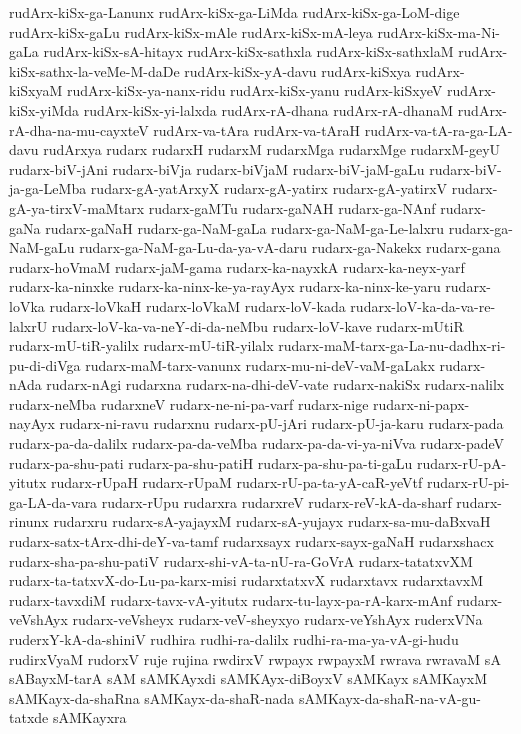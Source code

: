 {rudArx-kiSx-ga-Lanunx
rudArx-kiSx-ga-LiMda
rudArx-kiSx-ga-LoM-dige
rudArx-kiSx-gaLu
rudArx-kiSx-mAle
rudArx-kiSx-mA-leya
rudArx-kiSx-ma-Ni-gaLa
rudArx-kiSx-sA-hitayx
rudArx-kiSx-sathxla
rudArx-kiSx-sathxlaM
rudArx-kiSx-sathx-la-veMe-M-daDe
rudArx-kiSx-yA-davu
rudArx-kiSxya
rudArx-kiSxyaM
rudArx-kiSx-ya-nanx-ridu
rudArx-kiSx-yanu
rudArx-kiSxyeV
rudArx-kiSx-yiMda
rudArx-kiSx-yi-lalxda
rudArx-rA-dhana
rudArx-rA-dhanaM
rudArx-rA-dha-na-mu-cayxteV
rudArx-va-tAra
rudArx-va-tAraH
rudArx-va-tA-ra-ga-LA-davu
rudArxya
rudarx
rudarxH
rudarxM
rudarxMga
rudarxMge
rudarxM-geyU
rudarx-biV-jAni
rudarx-biVja
rudarx-biVjaM
rudarx-biV-jaM-gaLu
rudarx-biV-ja-ga-LeMba
rudarx-gA-yatArxyX
rudarx-gA-yatirx
rudarx-gA-yatirxV
rudarx-gA-ya-tirxV-maMtarx
rudarx-gaMTu
rudarx-gaNAH
rudarx-ga-NAnf
rudarx-gaNa
rudarx-gaNaH
rudarx-ga-NaM-gaLa
rudarx-ga-NaM-ga-Le-lalxru
rudarx-ga-NaM-gaLu
rudarx-ga-NaM-ga-Lu-da-ya-vA-daru
rudarx-ga-Nakekx
rudarx-gana
rudarx-hoVmaM
rudarx-jaM-gama
rudarx-ka-nayxkA
rudarx-ka-neyx-yarf
rudarx-ka-ninxke
rudarx-ka-ninx-ke-ya-rayAyx
rudarx-ka-ninx-ke-yaru
rudarx-loVka
rudarx-loVkaH
rudarx-loVkaM
rudarx-loV-kada
rudarx-loV-ka-da-va-re-lalxrU
rudarx-loV-ka-va-neY-di-da-neMbu
rudarx-loV-kave
rudarx-mUtiR
rudarx-mU-tiR-yalilx
rudarx-mU-tiR-yilalx
rudarx-maM-tarx-ga-La-nu-dadhx-ri-pu-di-diVga
rudarx-maM-tarx-vanunx
rudarx-mu-ni-deV-vaM-gaLakx
rudarx-nAda
rudarx-nAgi
rudarxna
rudarx-na-dhi-deV-vate
rudarx-nakiSx
rudarx-nalilx
rudarx-neMba
rudarxneV
rudarx-ne-ni-pa-varf
rudarx-nige
rudarx-ni-papx-nayAyx
rudarx-ni-ravu
rudarxnu
rudarx-pU-jAri
rudarx-pU-ja-karu
rudarx-pada
rudarx-pa-da-dalilx
rudarx-pa-da-veMba
rudarx-pa-da-vi-ya-niVva
rudarx-padeV
rudarx-pa-shu-pati
rudarx-pa-shu-patiH
rudarx-pa-shu-pa-ti-gaLu
rudarx-rU-pA-yitutx
rudarx-rUpaH
rudarx-rUpaM
rudarx-rU-pa-ta-yA-caR-yeVtf
rudarx-rU-pi-ga-LA-da-vara
rudarx-rUpu
rudarxra
rudarxreV
rudarx-reV-kA-da-sharf
rudarx-rinunx
rudarxru
rudarx-sA-yajayxM
rudarx-sA-yujayx
rudarx-sa-mu-daBxvaH
rudarx-satx-tArx-dhi-deY-va-tamf
rudarxsayx
rudarx-sayx-gaNaH
rudarxshacx
rudarx-sha-pa-shu-patiV
rudarx-shi-vA-ta-nU-ra-GoVrA
rudarx-tatatxvXM
rudarx-ta-tatxvX-do-Lu-pa-karx-misi
rudarxtatxvX
rudarxtavx
rudarxtavxM
rudarx-tavxdiM
rudarx-tavx-vA-yitutx
rudarx-tu-layx-pa-rA-karx-mAnf
rudarx-veVshAyx
rudarx-veVsheyx
rudarx-veV-sheyxyo
rudarx-veYshAyx
ruderxVNa
ruderxY-kA-da-shiniV
rudhira
rudhi-ra-dalilx
rudhi-ra-ma-ya-vA-gi-hudu
rudirxVyaM
rudorxV
ruje
rujina
rwdirxV
rwpayx
rwpayxM
rwrava
rwravaM
sA
sABayxM-tarA
sAM
sAMKAyxdi
sAMKAyx-diBoyxV
sAMKayx
sAMKayxM
sAMKayx-da-shaRna
sAMKayx-da-shaR-nada
sAMKayx-da-shaR-na-vA-gu-tatxde
sAMKayxra
}
